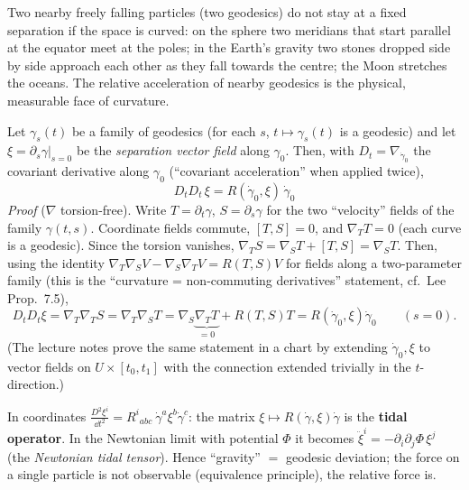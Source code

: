 \begin{intuition}
Two nearby freely falling particles (two geodesics) do not stay at a fixed separation if the space is curved: on the sphere two meridians that start parallel at the equator meet at the poles; in the Earth's gravity two stones dropped side by side approach each other as they fall towards the centre; the Moon stretches the oceans. The relative acceleration of nearby geodesics is the physical, measurable face of curvature.
\end{intuition}

\begin{formal}
Let $\gamma_s(t)$ be a family of geodesics (for each $s$, $t\mapsto\gamma_s(t)$ is a geodesic) and let $\xi=\partial_s\gamma|_{s=0}$ be the \emph{separation vector field} along $\gamma_0$. Then, with $D_t=\nabla_{\dot\gamma_0}$ the covariant derivative along $\gamma_0$ (``covariant acceleration'' when applied twice),
\[
\boxed{\ D_tD_t\,\xi=R(\dot\gamma_0,\xi)\,\dot\gamma_0\ }
\]
\emph{Proof} ($\nabla$ torsion-free). Write $T=\partial_t\gamma$, $S=\partial_s\gamma$ for the two ``velocity'' fields of the family $\gamma(t,s)$. Coordinate fields commute, $[T,S]=0$, and $\nabla_TT=0$ (each curve is a geodesic). Since the torsion vanishes, $\nabla_TS=\nabla_ST+[T,S]=\nabla_ST$. Then, using the identity $\nabla_T\nabla_SV-\nabla_S\nabla_TV=R(T,S)V$ for fields along a two-parameter family (this is the ``curvature = non-commuting derivatives'' statement, cf.\ Lee Prop.~7.5),
\[
D_tD_t\xi=\nabla_T\nabla_TS=\nabla_T\nabla_ST=\nabla_S\underbrace{\nabla_TT}_{=0}+R(T,S)T=R(\dot\gamma_0,\xi)\dot\gamma_0\qquad(s=0).
\]
(The lecture notes prove the same statement in a chart by extending $\dot\gamma_0,\xi$ to vector fields on $U\times[t_0,t_1]$ with the connection extended trivially in the $t$-direction.)
\end{formal}
\begin{intuition}[{curvature = tidal tensor}]
In coordinates $\frac{D^2\xi^i}{\dd t^2}=R^i{}_{abc}\ \dot\gamma^a\xi^b\dot\gamma^c$: the matrix $\xi\mapsto R(\dot\gamma,\xi)\dot\gamma$ is the \textbf{tidal operator}. In the Newtonian limit with potential $\Phi$ it becomes $\ddot\xi^i=-\partial_i\partial_j\Phi\,\xi^j$ (the \emph{Newtonian tidal tensor}). Hence ``gravity'' $=$ geodesic deviation; the force on a single particle is not observable (equivalence principle), the relative force is.
\end{intuition}

